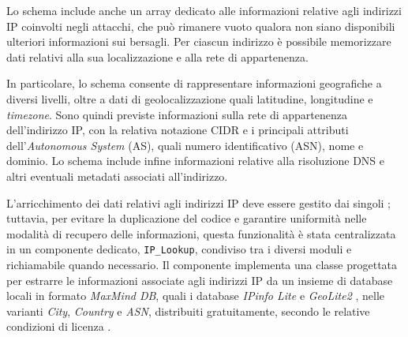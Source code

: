 Lo schema include anche un array dedicato alle informazioni relative agli indirizzi IP coinvolti negli attacchi, che può rimanere vuoto qualora non siano disponibili ulteriori informazioni sui bersagli. Per ciascun indirizzo è possibile memorizzare dati relativi alla sua localizzazione e alla rete di appartenenza.

In particolare, lo schema consente di rappresentare informazioni geografiche a diversi livelli, oltre a dati di geolocalizzazione quali latitudine, longitudine e \emph{timezone}. Sono quindi previste informazioni sulla rete di appartenenza dell'indirizzo IP, con la relativa notazione CIDR e i principali attributi dell'\emph{Autonomous System} (AS), quali numero identificativo (ASN), nome e dominio. Lo schema include infine informazioni relative alla risoluzione DNS e altri eventuali metadati associati all'indirizzo.



L'arricchimento dei dati relativi agli indirizzi IP deve essere gestito dai singoli \capture{}; tuttavia, per evitare la duplicazione del codice e garantire uniformità nelle modalità di recupero delle informazioni, questa funzionalità è stata centralizzata in un componente dedicato, \texttt{IP\_Lookup}, condiviso tra i diversi moduli e richiamabile quando necessario. Il componente implementa una classe progettata per estrarre le informazioni associate agli indirizzi IP da un insieme di database locali in formato \emph{MaxMind DB}, quali i database \emph{IPinfo Lite} \cite{ipinfo2026lite} e \emph{GeoLite2} \cite{maxmind2026geo}, nelle varianti \emph{City}, \emph{Country} e \emph{ASN}, distribuiti gratuitamente, secondo le relative condizioni di licenza \cite{ipinfo2026lite, maxmind2026geo}.


